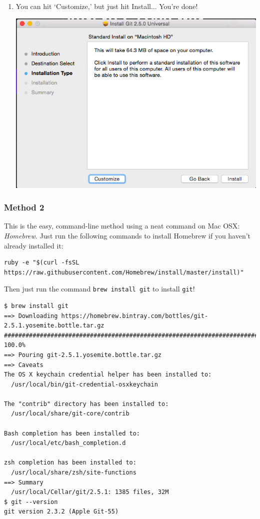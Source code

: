 \documentclass[11pt,fleqn]{article}
\theoremstyle{definition}
\begin{document}
\begin{enumerate}[Step 1.]
\item You can hit `Customize,' but just hit Install... You're done!
\begin{center}
\includegraphics[scale=0.5]{gitmacinstall3.png}
\end{center}
\end{enumerate}

\newpage
\subsubsection{Method 2}
This is the easy, command-line method using a neat command on Mac OSX:
\textit{Homebrew}. Just run the following commands to install Homebrew if you
haven't already installed it:

\begin{center}
\begin{verbatim}
ruby -e "$(curl -fsSL https://raw.githubusercontent.com/Homebrew/install/master/install)"
\end{verbatim}
\end{center}

Then just run the command \verb|brew install git| to install \texttt{git}!

\begin{verbatim}
$ brew install git
==> Downloading https://homebrew.bintray.com/bottles/git-2.5.1.yosemite.bottle.tar.gz
######################################################################## 100.0%
==> Pouring git-2.5.1.yosemite.bottle.tar.gz
==> Caveats
The OS X keychain credential helper has been installed to:
  /usr/local/bin/git-credential-osxkeychain

The "contrib" directory has been installed to:
  /usr/local/share/git-core/contrib

Bash completion has been installed to:
  /usr/local/etc/bash_completion.d

zsh completion has been installed to:
  /usr/local/share/zsh/site-functions
==> Summary
  /usr/local/Cellar/git/2.5.1: 1385 files, 32M
$ git --version
git version 2.3.2 (Apple Git-55)
\end{verbatim}
\end{document}
